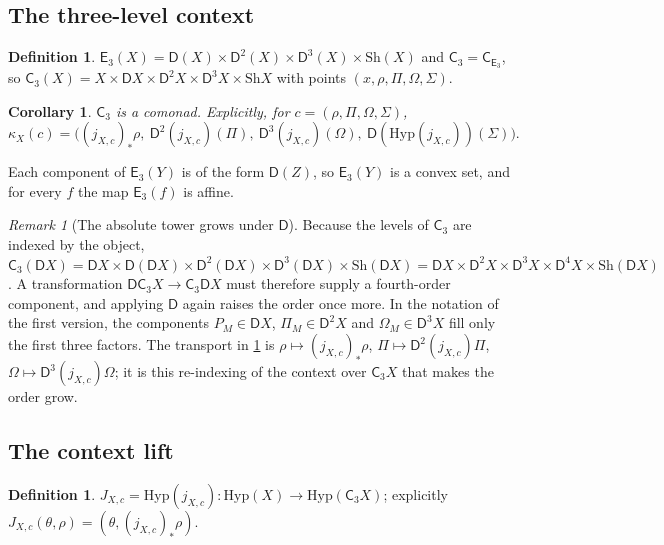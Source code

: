 \documentclass[11pt]{article}
\newtheorem{corollary}[theorem]{Corollary}
\theoremstyle{definition}
\newtheorem{definition}[theorem]{Definition}
\theoremstyle{remark}
\newtheorem{remark}[theorem]{Remark}
\newcommand{\D}{\mathsf{D}}
\newcommand{\Hyp}{\mathrm{Hyp}}
\newcommand{\Sh}{\mathrm{Sh}}
\newcommand{\C}{\mathsf{C}}
\newcommand{\E}{\mathsf{E}}
\begin{document}
\subsection{The three-level context}

\begin{definition}
$\E_3(X)=\D(X)\times\D^2(X)\times\D^3(X)\times\Sh(X)$ and
$\C_3=\C_{\E_3}$, so $\C_3(X)=X\times\D X\times\D^2X\times\D^3X\times\Sh X$ with points
$(x,\rho,\Pi,\Omega,\Sigma)$.
\end{definition}

\begin{corollary}\label{cor:C3}
$\C_3$ is a comonad. Explicitly, for $c=(\rho,\Pi,\Omega,\Sigma)$,
\[
\kappa_X(c)=\big((j_{X,c})_*\rho,\ \D^2(j_{X,c})(\Pi),\ \D^3(j_{X,c})(\Omega),\
\D(\Hyp(j_{X,c}))(\Sigma)\big).
\]
\end{corollary}

Each component of $\E_3(Y)$ is of the form $\D(Z)$, so $\E_3(Y)$ is a convex set, and for every $f$
the map $\E_3(f)$ is affine.

\begin{remark}[The absolute tower grows under $\D$]\label{rem:growth}
Because the levels of $\C_3$ are indexed by the object,
$\C_3(\D X)=\D X\times\D(\D X)\times\D^2(\D X)\times\D^3(\D X)\times\Sh(\D X)
=\D X\times\D^2X\times\D^3X\times\D^4X\times\Sh(\D X)$. A transformation
$\D\C_3X\to\C_3\D X$ must therefore supply a fourth-order component, and applying $\D$ again raises
the order once more. In the notation of the first version, the components $P_M\in\D X$,
$\Pi_M\in\D^2X$ and $\Omega_M\in\D^3X$ fill only the first three factors. The transport in
\cref{cor:C3} is $\rho\mapsto(j_{X,c})_*\rho$, $\Pi\mapsto\D^2(j_{X,c})\Pi$,
$\Omega\mapsto\D^3(j_{X,c})\Omega$; it is this re-indexing of the context over $\C_3X$ that makes the
order grow.
\end{remark}

\subsection{The context lift}

\begin{definition}
$J_{X,c}=\Hyp(j_{X,c})\colon\Hyp(X)\to\Hyp(\C_3X)$; explicitly
$J_{X,c}(\theta,\rho)=(\theta,(j_{X,c})_*\rho)$.
\end{definition}
\end{document}
